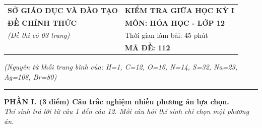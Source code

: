 \documentclass[11pt,a4paper]{article}
\begin{document}
\begin{table}[h!]
\centering
\begin{tabularx}{\textwidth}{@{}p{8.5cm}X@{}}
\textbf{SỞ GIÁO DỤC VÀ ĐÀO TẠO} & \textbf{KIỂM TRA GIỮA HỌC KỲ I} \\
\textbf{ĐỀ CHÍNH THỨC} & \textbf{MÔN: HÓA HỌC - LỚP 12} \\
\textit{(Đề thi có 03 trang)} & Thời gian làm bài: 45 phút \\
\textbf{ } & \textbf{MÃ ĐỀ: 112} \\
\end{tabularx}
\end{table}


\noindent\textit{(Nguyên tử khối trung bình của: H=1, C=12, O=16, N=14, S=32, Na=23, Ag=108, Br=80)}
\par\vspace{-2pt}\noindent\textcolor{gray!40}{\rule{\textwidth}{0.5pt}}\par\vspace{2pt}


\noindent\textbf{\large\color{mainGreen}PHẦN I. (3 điểm) Câu trắc nghiệm nhiều phương án lựa chọn.}\\
\textit{Thí sinh trả lời từ câu 1 đến câu 12. Mỗi câu hỏi thí sinh chỉ chọn một phương án.}
\vspace{4pt}
\end{document}
